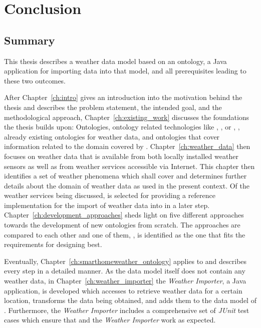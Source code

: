 \chapter{Conclusion}
\label{ch:conclusion}

\section{Summary}

This thesis describes a weather data model based on an  ontology, a Java application for importing data into that model, and all prerequisites leading to these two outcomes.

After Chapter~\ref{ch:intro} gives an introduction into the motivation behind the thesis and describes the problem statement, the intended goal, and the methodological approach, Chapter~\ref{ch:existing_work} discusses the foundations the thesis builds upon: Ontologies, ontology related technologies like , , or , \thinkhome, already existing ontologies for weather data, and ontologies that cover information related to the domain covered by \smarthomeweather. Chapter~\ref{ch:weather_data} then focuses on weather data that is available from both locally installed weather sensors as well as from weather services accessible via Internet. This chapter then identifies a set of weather phenomena which \smarthomeweather shall cover and determines further details about the domain of weather data as used in the present context.
Of the weather services being discussed, \yrno is selected for providing a reference implementation for the import of weather data into \smarthomeweather in a later step. Chapter~\ref{ch:development_approaches} sheds light on five different approaches towards the development of new ontologies from scratch. The approaches are compared to each other and one of them, \methontology, is identified as the one that fits the requirements for designing \smarthomeweather best.

Eventually, Chapter~\ref{ch:smarthomeweather_ontology} applies \methontology to \smarthomeweather and describes every step in a detailed manner. As the data model itself does not contain any weather data, in Chapter~\ref{ch:weather_importer} the \emph{Weather Importer}, a Java application, is developed which accesses \yrno to retrieve weather data for a certain location, transforms the data being obtained, and adds them to the data model of \smarthomeweather. Furthermore, the \emph{Weather Importer} includes a comprehensive set of \emph{JUnit} test cases which ensure that \smarthomeweather and the \emph{Weather Importer} work as expected.

